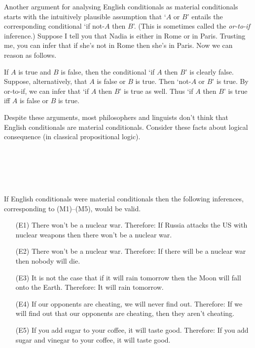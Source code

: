Another argument for analysing English conditionals as material conditionals
starts with the intuitively plausible assumption that `$A$ or $B$' entails the
corresponding conditional `if not-$A$ then $B$'. (This is sometimes called the
\emph{or-to-if} inference.) Suppose I tell you that Nadia is either in Rome or
in Paris. Trusting me, you can infer that if she's not in Rome then she's in
Paris. Now we can reason as follows.

If $A$ is true and $B$ is false, then the conditional `if $A$ then $B$' is
clearly false. Suppose, alternatively, that $A$ is false or $B$ is true. Then
`not-$A$ or $B$' is true. By or-to-if, we can infer that `if $A$ then $B$' is
true as well. Thus `if $A$ then $B$' is true iff $A$ is false or $B$ is true.

Despite these arguments, most philosophers and linguists don't think that
English conditionals are material conditionals. Consider these facts about
logical consequence (in classical propositional logic).
%
\begin{principles}\label{paradoxes-mat-imp}
\\
\\
\\
\\
\end{principles}

If English conditionals were material conditionals then the following
inferences, corresponding to (M1)--(M5), would be valid.

\begin{enumerate}[leftmargin=12mm]
  \itemsep1mm
  \item[(E1)] There won't be a nuclear war. Therefore: If Russia attacks the US
        with nuclear weapons then there won't be a nuclear war.
  \item[(E2)] There won't be a nuclear war. Therefore: If there will be a
        nuclear war then nobody will die.
  \item[(E3)] It is not the case that if it will rain tomorrow then the Moon
        will fall onto the Earth. Therefore: It will rain tomorrow.
  \item[(E4)] If our opponents are cheating, we will never find out. Therefore:
        If we will find out that our opponents are cheating, then they aren't
        cheating.
  \item[(E5)] If you add sugar to your coffee, it will taste good. Therefore: If
        you add sugar and vinegar to your coffee, it will taste good.
\end{enumerate}

